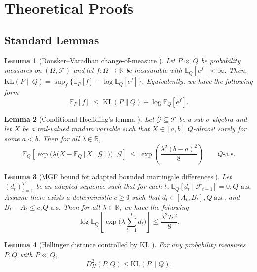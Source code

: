 \documentclass[11pt]{article}
\newtheorem{lemma}{Lemma}
\providecommand{\R}{\mathbb{R}}
\providecommand{\E}{\mathbb{E}}
\begin{document}
\section{Theoretical Proofs}

\subsection{Standard Lemmas}

\begin{lemma}[Donsker--Varadhan change-of-measure {\cite[Thm.~4.6]{PolyanskiyWu2025}}]
\label{lem:DV}
Let $P\ll Q$ be probability measures on $(\Omega,\mathcal F)$ and let $f:\Omega\to\mathbb{R}$ be measurable with
$\mathbb E_Q[e^{f}]<\infty$. Then,
$\mathrm{KL}(P\|Q) = \sup_f \{\mathbb E_P[f]-\log\mathbb E_Q[e^f]\}$. Equivalently, we have the following form
\[
\mathbb E_P[f] \;\le\; \mathrm{KL}(P\|Q) + \log \mathbb E_Q[e^{f}].
\]
\end{lemma}

\begin{lemma}[Conditional Hoeffding's lemma {\cite[Defn.~4.15]{PolyanskiyWu2025}}]
\label{lem:Hoeffding}
Let $\mathcal G\subseteq\mathcal F$ be a sub-$\sigma$-algebra and let $X$ be a real-valued
random variable such that $X\in[a,b]$ $Q$-almost surely for some $a<b$.
Then for all $\lambda\in\R$,
\[
\E_Q\!\left[\exp\!\Big(\lambda\big(X-\E_Q[X\mid\mathcal G]\big)\Big)\,\Big|\,\mathcal G\right]
\;\le\;
\exp\!\left(\frac{\lambda^2(b-a)^2}{8}\right)
\qquad Q\text{-a.s.}
\]
\end{lemma}


\begin{lemma}[MGF bound for adapted bounded martingale differences {\cite[Cor.~2.20]{wainwright2019hds}}]
\label{lem:md_mgf}
Let $(d_t)_{t=1}^T$ be an adapted sequence such that for each $t$,
\(
\E_Q[d_t\mid \mathcal F_{t-1}] = 0, Q\text{-a.s.}
\)
Assume there exists a deterministic $c\ge 0$ such that \(
d_t \in [A_t,B_t], Q\text{-a.s.}\), and \(B_t-A_t \le c, Q\text{-a.s.}
\)
Then for all $\lambda\in\R$, we have the following
\[
\log \E_Q\!\left[\exp\!\Big(\lambda\sum_{t=1}^T d_t\Big)\right]
\le
\frac{\lambda^2 T c^2}{8}.
\]
\end{lemma}





\begin{lemma}[Hellinger distance controlled by KL {\cite[Lemma A.5]{foster2021statistical}}]
\label{lem:hellinger-le-kl}
For any probability measures $P,Q$ with $P\ll Q$,
\[
D_H^2(P,Q) \le \mathrm{KL}(P\|Q).
\]
\end{lemma}
\end{document}
